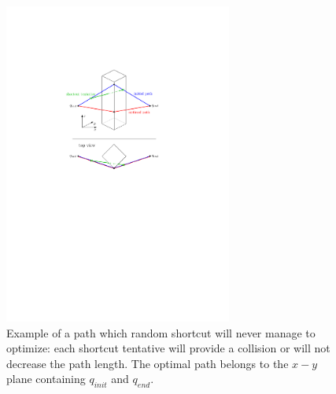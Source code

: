 \documentclass{tADR2e}
\begin{document}
\begin{figure}[H]
	\centering
	\includegraphics[width=7.5cm]{decoupled_DOF_optimization.pdf}
	\caption{Example of a path which random shortcut will never manage to 
	optimize: each shortcut tentative will provide a collision or will not 
	decrease the path length. The optimal path belongs to the $x-y$ plane 
	containing $q_{init}$ and $q_{end}$.}
	\label{decoupled_DOF_optimization}
\end{figure}
\end{document}
